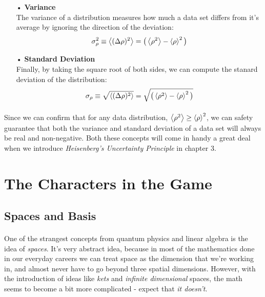 \documentclass[12pt,letterpaper]{book}
\begin{document}
\begin{enumerate}
\item[•]\textbf{Variance}\\
The variance of a distribution measures how much a data set differs from it's average by ignoring the direction of the deviation:
\begin{equation}
\label{variance}
\sigma_{\rho}^2 \equiv \expval{(\Delta \rho)^2} = \big( \expval{\rho^2} - \expval{\rho}^2 \big)
\end{equation}
\item[•]\textbf{Standard Deviation}\\
Finally, by taking the square root of both sides, we can compute the stanard deviation of the distribution:
\begin{equation}
\label{std dev}
\sigma_{\rho} \equiv \sqrt{\expval{(\Delta \rho)^2}} = \sqrt{\big( \expval{\rho^2} - \expval{\rho}^2 \big)}
\end{equation}
\end{enumerate}
\paragraph*{}Since we can confirm that for any data distribution, $\expval{\rho^2} \geq \expval{\rho}^2$, we can safety guarantee that both the variance and standard deviation of a data set will always be real and non-negative. Both these concepts will come in handy a great deal when we introduce \textit{Heisenberg's Uncertainty Principle} in chapter 3.


\section{The Characters in the Game}


\subsection*{Spaces and Basis}
\paragraph*{}One of the strangest concepts from quantum physics and linear algebra is the idea of \textit{spaces}. It's very abstract idea, because in most of the mathematics done in our everyday careers we can treat space as the dimension that we're working in, and almost never have to go beyond three spatial dimensions. However, with the introduction of ideas like \textit{kets} and \textit{infinite dimensional} spaces, the math seems to become a bit more complicated - expect that \textit{it doesn't}.
\end{document}
